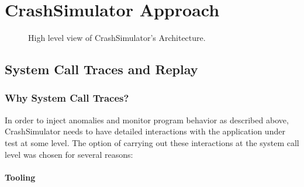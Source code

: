 \section{CrashSimulator Approach }
\label{sec:approach}
    \begin{figure}[t]
        \center{}
        \caption{High level view of CrashSimulator's Architecture.}
        \label{figure:architecture}
    \end{figure}
    
    \subsection{System Call Traces and Replay}

        \subsubsection{Why System Call Traces?}

        In order to inject anomalies and monitor program behavior as described
        above, CrashSimulator needs to have detailed interactions with the
        application under test at some level.  The option of carrying out these
        interactions at the system call level was chosen for several
        reasons:

        \paragraph{Tooling}

